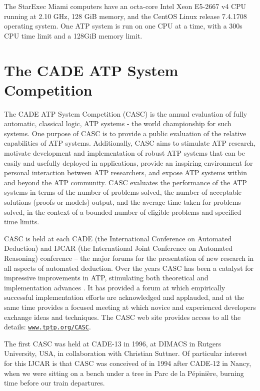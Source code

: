 \documentclass{easychair}
\begin{document}
The StarExec Miami computers have an
octa-core Intel Xeon E5-2667 v4 CPU running at 2.10 GHz,
128 GiB memory,
and the CentOS Linux release 7.4.1708 operating system.
One ATP system is run on one CPU at a time, with a 300s CPU time limit and a 128GiB memory
limit.

\section{The CADE ATP System Competition}
\label{CASC}

The CADE ATP System Competition (CASC) \cite{Sut16} is the annual evaluation of fully automatic,
classical logic, ATP systems - the world championship for such systems.
One purpose of CASC is to provide a public evaluation of the relative capabilities of ATP systems.
Additionally, CASC aims to
stimulate ATP research,
motivate development and implementation of robust ATP systems that can be easily and usefully
deployed in applications,
provide an inspiring environment for personal interaction between ATP researchers,
and
expose ATP systems within and beyond the ATP community.
CASC evaluates the performance of the ATP systems in terms of
the number of problems solved,
the number of acceptable solutions (proofs or models) output, and
the average time taken for problems solved,
in the context of
a bounded number of eligible problems and
specified time limits.

CASC is held at each CADE (the International Conference on Automated Deduction) and IJCAR
(the International Joint Conference on Automated Reasoning) conference -- the major forums
for the presentation of new research in all aspects of automated deduction.
Over the years CASC has been a catalyst for impressive improvements in ATP, stimulating both 
theoretical and implementation advances \cite{Nie02-Paper}.
It has provided a forum at which empirically successful implementation efforts are acknowledged 
and applauded, and at the same time provides a focused meeting at which novice and experienced 
developers exchange ideas and techniques. 
The CASC web site provides access to all the details:
\href{http://www.tptp.org/CASC/}{{\tt www.tptp.org/CASC}}.

The first CASC was held at CADE-13 in 1996, at DIMACS in Rutgers University, USA, in collaboration
with Christian Suttner.
Of particular interest for this IJCAR is that CASC was conceived of in 1994 after CADE-12 in
Nancy, when we were sitting on a bench under a tree in Parc de la Pépinière, burning time before
our train departures.
\end{document}
